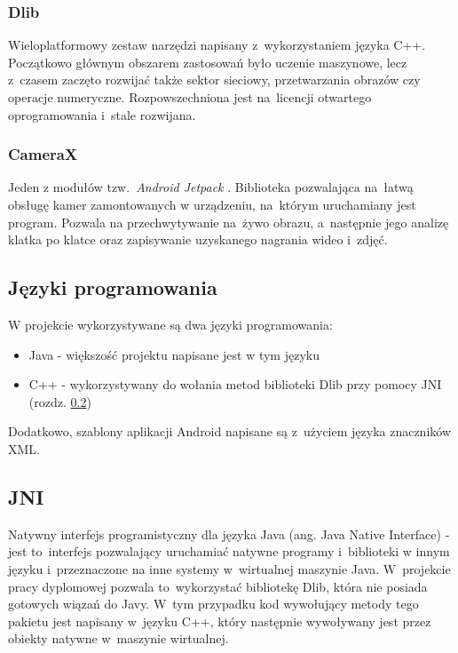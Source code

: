 \subsubsection{Dlib}

Wieloplatformowy zestaw narzędzi \cite{dlib} napisany z~wykorzystaniem języka C++. Początkowo głównym obszarem zastosowań było uczenie maszynowe, lecz z~czasem zaczęto rozwijać także sektor sieciowy, przetwarzania obrazów czy operacje numeryczne. Rozpowszechniona jest na~licencji otwartego oprogramowania i~stale rozwijana. 

\subsubsection{CameraX}

Jeden z modułów \cite{camerax} tzw.~\textit{Android Jetpack} \cite{android_jetpack}. Biblioteka pozwalająca na~łatwą obsługę kamer zamontowanych w urządzeniu, na~którym uruchamiany jest program. Pozwala na przechwytywanie na~żywo obrazu, a~następnie jego analizę klatka po klatce oraz zapisywanie uzyskanego nagrania wideo i~zdjęć. 


\subsection{Języki programowania}

W projekcie wykorzystywane są dwa języki programowania:

\begin{itemize}
    \item Java - większość projektu napisane jest w tym języku
    \item C++ - wykorzystywany do wołania metod biblioteki Dlib przy pomocy JNI (rozdz. \ref{section:jni})
\end{itemize}

Dodatkowo, szablony aplikacji Android napisane są z~użyciem języka znaczników XML.

\subsection{JNI} \label{section:jni}

Natywny interfejs programistyczny dla języka Java (ang. Java Native Interface) \cite{jni} -  jest to~interfejs pozwalający uruchamiać natywne programy i~biblioteki w innym języku i~przeznaczone na inne systemy w~wirtualnej maszynie Java. W~projekcie pracy dyplomowej pozwala to~wykorzystać bibliotekę Dlib, która nie posiada gotowych wiązań do Javy. W~tym przypadku kod wywołujący metody tego pakietu jest napisany w~języku C++, który następnie wywoływany jest przez obiekty natywne w~maszynie wirtualnej. 